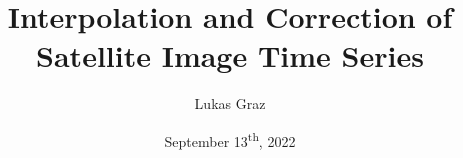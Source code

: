 \documentclass[11pt,aspectratio=169]{beamer}
\title{Interpolation and Correction of
\\ Satellite Image Time Series}
\date[13.09.2022]{September 13\textsuperscript{th}, 2022} %
\author{Lukas Graz}
\institute{D-MATH --- Seminar for Statistics \\ D-USYS --- Crop Science}
\begin{document}

\def\titlefigure{../latex/figures/satelite/sentinel-2-cover_cropped}
\titleframe




















% 
% 
\end{document}
